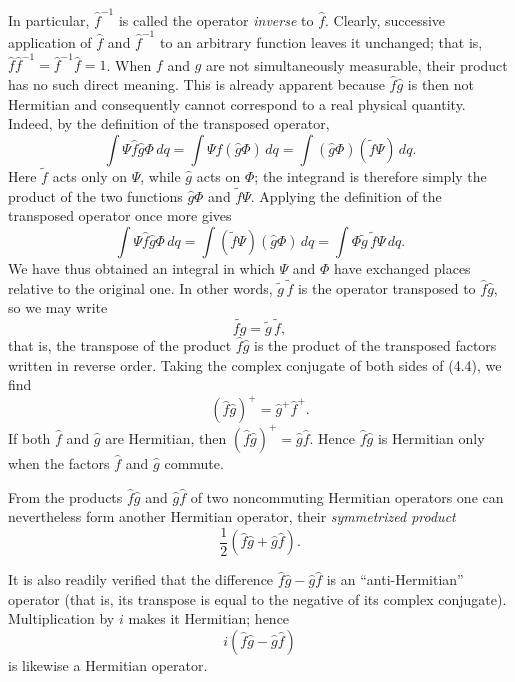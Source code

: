 In particular, $\hat f^{-1}$ is called the operator \emph{inverse} to
$\hat f$. Clearly, successive application of $\hat f$ and $\hat f^{-1}$ to an
arbitrary function leaves it unchanged; that is,
$\hat f\hat f^{-1}=\hat f^{-1}\hat f=1$.
When $f$ and $g$ are not simultaneously measurable, their product has no such
direct meaning. This is already apparent because $\hat f\hat g$ is then not
Hermitian and consequently cannot correspond to a real physical quantity.
Indeed, by the definition of the transposed operator,
\[
  \int \Psi\hat f\hat g\Phi\,dq
  =\int \Psi\hat f(\hat g\Phi)\,dq
  =\int(\hat g\Phi)(\tilde f\Psi)\,dq.
\]
Here $\tilde f$ acts only on $\Psi$, while $\hat g$ acts on $\Phi$; the
integrand is therefore simply the product of the two functions $\hat g\Phi$
and $\tilde f\Psi$. Applying the definition of the transposed operator
once more gives
\[
  \int \Psi\hat f\hat g\Phi\,dq
  =\int(\tilde f\Psi)(\hat g\Phi)\,dq
  =\int\Phi\tilde g\,\tilde f\Psi\,dq.
\]
We have thus obtained an integral in which $\Psi$ and $\Phi$ have exchanged
places relative to the original one. In other words,
$\tilde g\,\tilde f$ is the operator transposed to $\hat f\hat g$, so
we may write
\begin{equation}
  \tilde{fg}=\tilde g\,\tilde f,
  \tag{4.4}
\end{equation}
that is, the transpose of the product $\hat f\hat g$ is the product of the
transposed factors written in reverse order. Taking the complex conjugate of
both sides of (4.4), we find
\begin{equation}
  (\hat f\hat g)^+=\hat g^+\hat f^+.
  \tag{4.5}
\end{equation}
If both $\hat f$ and $\hat g$ are Hermitian, then
$(\hat f\hat g)^+=\hat g\hat f$. Hence $\hat f\hat g$ is Hermitian only when
the factors $\hat f$ and $\hat g$ commute.

From the products $\hat f\hat g$ and $\hat g\hat f$ of two noncommuting
Hermitian operators one can nevertheless form another Hermitian operator,
their \emph{symmetrized product}
\begin{equation}
  \frac{1}{2}(\hat f\hat g+\hat g\hat f).
  \tag{4.6}
\end{equation}

It is also readily verified that the difference
$\hat f\hat g-\hat g\hat f$ is an ``anti-Hermitian'' operator (that is, its
transpose is equal to the negative of its complex
conjugate). Multiplication by $i$ makes it Hermitian; hence
\begin{equation}
  i(\hat f\hat g-\hat g\hat f)
  \tag{4.7}
\end{equation}
is likewise a Hermitian operator.

